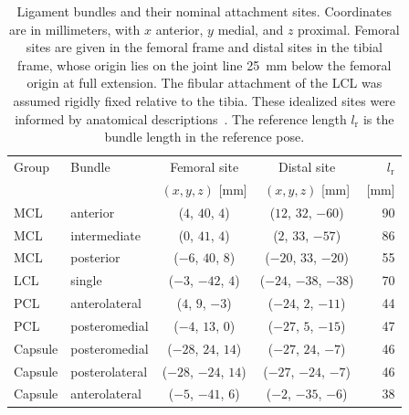 \begin{table}[H]
\centering
\caption{Ligament bundles and their nominal attachment sites.
Coordinates are in millimeters, with $x$ anterior, $y$ medial, and $z$ proximal.
Femoral sites are given in the femoral frame and distal sites in the tibial frame, whose origin lies on the joint line \SI{25}{\milli\meter} below the femoral origin at full extension.
The fibular attachment of the LCL was assumed rigidly fixed relative to the tibia.
These idealized sites were informed by anatomical descriptions~\autocite{laprade2007anatomy,laprade2003posterolateral,claes2013anatomy,amis2006anatomy}.
The reference length $l_\mathrm{r}$ is the bundle length in the reference pose.}
\label{tab:bundles}
\small
\begin{tabular}{llccr}
\toprule
Group & Bundle & Femoral site & Distal site & $l_\mathrm{r}$\\
 & & $(x, y, z)$ [\si{\milli\meter}] & $(x, y, z)$ [\si{\milli\meter}] & [\si{\milli\meter}]\\
\midrule
MCL & anterior & ($4$, $40$, $4$) & ($12$, $32$, $-60$) & 90\\
MCL & intermediate & ($0$, $41$, $4$) & ($2$, $33$, $-57$) & 86\\
MCL & posterior & ($-6$, $40$, $8$) & ($-20$, $33$, $-20$) & 55\\
LCL & single & ($-3$, $-42$, $4$) & ($-24$, $-38$, $-38$) & 70\\
PCL & anterolateral & ($4$, $9$, $-3$) & ($-24$, $2$, $-11$) & 44\\
PCL & posteromedial & ($-4$, $13$, $0$) & ($-27$, $5$, $-15$) & 47\\
Capsule & posteromedial & ($-28$, $24$, $14$) & ($-27$, $24$, $-7$) & 46\\
Capsule & posterolateral & ($-28$, $-24$, $14$) & ($-27$, $-24$, $-7$) & 46\\
Capsule & anterolateral & ($-5$, $-41$, $6$) & ($-2$, $-35$, $-6$) & 38\\
\bottomrule
\end{tabular}
\end{table}
